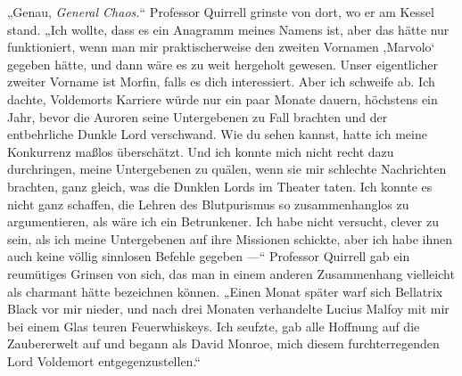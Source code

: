 „Genau, \emph{General Chaos.}“
Professor Quirrell grinste von dort, wo er am Kessel stand.
„Ich wollte, dass es ein Anagramm meines Namens ist, aber das hätte nur funktioniert, wenn man mir praktischerweise den zweiten Vornamen ‚Marvolo‘ gegeben hätte, und dann wäre es zu weit hergeholt gewesen. Unser eigentlicher zweiter Vorname ist Morfin, falls es dich interessiert. Aber ich schweife ab. Ich dachte, Voldemorts Karriere würde nur ein paar Monate dauern, höchstens ein Jahr, bevor die Auroren seine Untergebenen zu Fall brachten und der entbehrliche Dunkle Lord verschwand. Wie du sehen kannst, hatte ich meine Konkurrenz maßlos überschätzt. Und ich konnte mich nicht recht dazu durchringen, meine Untergebenen zu quälen, wenn sie mir schlechte Nachrichten brachten, ganz gleich, was die Dunklen Lords im Theater taten. Ich konnte es nicht ganz schaffen, die Lehren des Blutpurismus so zusammenhanglos zu argumentieren, als wäre ich ein Betrunkener. Ich habe nicht versucht, clever zu sein, als ich meine Untergebenen auf ihre Missionen schickte, aber ich habe ihnen auch keine völlig sinnlosen Befehle gegeben —“
Professor Quirrell gab ein reumütiges Grinsen von sich, das man in einem anderen Zusammenhang vielleicht als charmant hätte bezeichnen können.
„Einen Monat später warf sich Bellatrix Black vor mir nieder, und nach drei Monaten verhandelte Lucius Malfoy mit mir bei einem Glas teuren Feuerwhiskeys. Ich seufzte, gab alle Hoffnung auf die Zaubererwelt auf und begann als David Monroe, mich diesem furchterregenden Lord Voldemort entgegenzustellen.“

